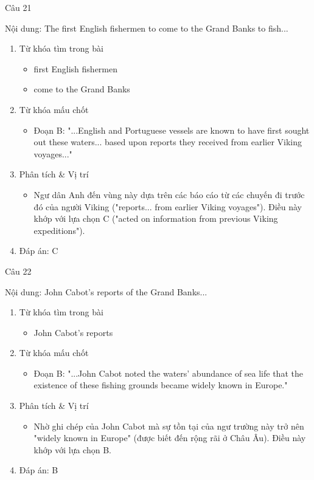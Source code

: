 \documentclass{../templateReading/cdreading}
\begin{document}
Câu 21

Nội dung: The first English fishermen to come to the Grand Banks to fish...
\begin{enumerate}
\item Từ khóa tìm trong bài
\begin{itemize}
\item first English fishermen
\item come to the Grand Banks
\end{itemize}
\item Từ khóa mấu chốt
\begin{itemize}
\item Đoạn B: "...English and Portuguese vessels are known to have first sought out these waters... based upon reports they received from earlier Viking voyages..."
\end{itemize}
\item Phân tích \& Vị trí
\begin{itemize}
\item Ngư dân Anh đến vùng này dựa trên các báo cáo từ các chuyến đi trước đó của người Viking ("reports... from earlier Viking voyages"). Điều này khớp với lựa chọn C ("acted on information from previous Viking expeditions").
\end{itemize}
\item Đáp án: C
\end{enumerate}

Câu 22

Nội dung: John Cabot’s reports of the Grand Banks...
\begin{enumerate}
\item Từ khóa tìm trong bài
\begin{itemize}
\item John Cabot’s reports
\end{itemize}
\item Từ khóa mấu chốt
\begin{itemize}
\item Đoạn B: "...John Cabot noted the waters’ abundance of sea life that the existence of these fishing grounds became widely known in Europe."
\end{itemize}
\item Phân tích \& Vị trí
\begin{itemize}
\item Nhờ ghi chép của John Cabot mà sự tồn tại của ngư trường này trở nên "widely known in Europe" (được biết đến rộng rãi ở Châu Âu). Điều này khớp với lựa chọn B.
\end{itemize}
\item Đáp án: B
\end{enumerate}
\end{document}
